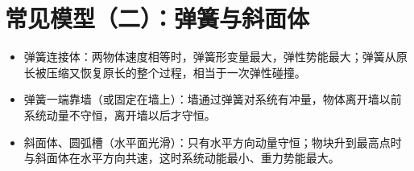 \documentclass[\gkver]{gaokaozhenti}
\begin{document}
\section{常见模型（二）：弹簧与斜面体}
\begin{yaodian}
\begin{itemize}
\item 弹簧连接体：两物体速度相等时，弹簧形变量最大，弹性势能最大；弹簧从原长被压缩又恢复原长的整个过程，相当于一次弹性碰撞。
\item 弹簧一端靠墙（或固定在墙上）：墙通过弹簧对系统有冲量，物体离开墙以前系统动量不守恒，离开墙以后才守恒。
\item 斜面体、圆弧槽（水平面光滑）：只有水平方向动量守恒；物块升到最高点时与斜面体在水平方向共速，这时系统动能最小、重力势能最大。
\end{itemize}
\end{yaodian}
\end{document}
